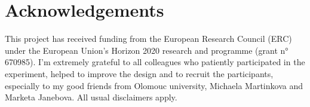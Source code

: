 \documentclass[output=paper]{langsci/langscibook}
\begin{document}
\section*{Acknowledgements}

This project has received funding from the European Research Council (ERC) under the European Union's Horizon 2020 research and  programme (grant  n° 670985). I’m extremely grateful to all colleagues who patiently participated in the experiment, helped to improve the design and to recruit the participants, especially to my good friends from Olomouc university, Michaela Martinkova and Marketa Janebova. All usual disclaimers apply.

\sloppy
\printbibliography[heading=subbibliography,notkeyword=this] 
\end{document}
